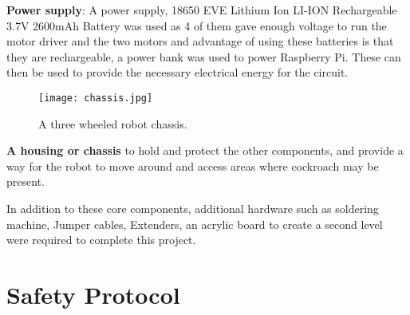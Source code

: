 \documentclass[11pt]{article}
\begin{document}
	
	\textbf{Power supply}: A power supply, 18650 EVE Lithium Ion LI-ION Rechargeable 3.7V 2600mAh Battery was used as 4 of them gave enough voltage to run the motor driver and the two motors and advantage of using these batteries is that they are rechargeable, a power bank was used to power Raspberry Pi. These can then be used to provide the necessary electrical energy for the circuit.
				\begin{center}
	
		\begin{figure}[H]
		\centering
		\texttt{[image: chassis.jpg]}
		\caption{ A three wheeled robot chassis.   }
		\label{fig:Flowchart}
	\end{figure}
\end{center}
	\textbf{	A housing or chassis} to hold and protect the other components, and provide a way for the robot to move around and access areas where cockroach may be present.
	
	In addition to these core components, additional hardware such as soldering machine, Jumper cables, Extenders, an acrylic board to create a second level were required to complete this project.
	
	\section{Safety Protocol}
	
\end{document}
